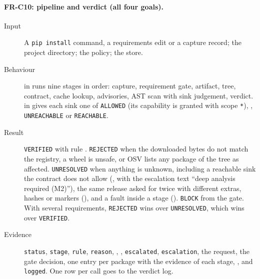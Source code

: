\paragraph{FR-C10: pipeline and verdict (all four goals).}
\begin{sloppypar}
\begin{description}
    \item[Input] A \texttt{pip install} command, a requirements edit or a capture record; the project directory; the policy; the store.
    \item[Behaviour]  in  runs nine stages in order: capture, requirement gate, artifact, tree, contract, cache lookup, advisories, AST scan with sink judgement, verdict.  in  gives each sink one of \texttt{ALLOWED} (its capability is granted with scope \texttt{*}), , \texttt{UNREACHABLE} or \texttt{REACHABLE}.
    \item[Result] \texttt{VERIFIED} with rule . \texttt{REJECTED} when the downloaded bytes do not match the registry, a wheel is unsafe, or OSV lists any package of the tree as affected. \texttt{UNRESOLVED} when anything is unknown, including a reachable sink the contract does not allow (, with the escalation text ``deep analysis required (M2)''), the same release asked for twice with different extras, hashes or markers (), and a fault inside a stage (). \texttt{BLOCK} from the gate. With several requirements, \texttt{REJECTED} wins over \texttt{UNRESOLVED}, which wins over \texttt{VERIFIED}.
    \item[Evidence] \texttt{status}, \texttt{stage}, \texttt{rule}, \texttt{reason}, , , \texttt{escalated}, \texttt{escalation}, the request, the gate decision, one entry per package with the evidence of each stage, ,  and \texttt{logged}. One row per call goes to the verdict log.
\end{description}
\end{sloppypar}

